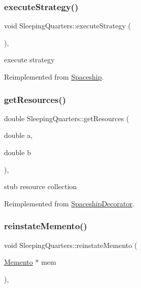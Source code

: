 \subsubsection{\texorpdfstring{execute\+Strategy()}{executeStrategy()}}
{\footnotesize\ttfamily void Sleeping\+Quarters\+::execute\+Strategy (\begin{DoxyParamCaption}{ }\end{DoxyParamCaption})\hspace{0.3cm}{\ttfamily [inline]}, {\ttfamily [virtual]}}

execute strategy 

Reimplemented from \hyperlink{classSpaceship}{Spaceship}.

\mbox{\label{classSleepingQuarters_aa1c2a40c05a566955965dee8118dc410}} 
\subsubsection{\texorpdfstring{get\+Resources()}{getResources()}}
{\footnotesize\ttfamily double Sleeping\+Quarters\+::get\+Resources (\begin{DoxyParamCaption}\item[{double}]{a,  }\item[{double}]{b }\end{DoxyParamCaption})\hspace{0.3cm}{\ttfamily [inline]}, {\ttfamily [virtual]}}

stub resource collection 

Reimplemented from \hyperlink{classSpaceshipDecorator_a5ee7a9a8c146c85f08591e47d971dce7}{Spaceship\+Decorator}.

\mbox{\label{classSleepingQuarters_a9a1fd96cb88a4eee245c7dda3672fac5}} 
\subsubsection{\texorpdfstring{reinstate\+Memento()}{reinstateMemento()}}
{\footnotesize\ttfamily void Sleeping\+Quarters\+::reinstate\+Memento (\begin{DoxyParamCaption}\item[{\hyperlink{classMemento}{Memento} $\ast$}]{mem }\end{DoxyParamCaption})\hspace{0.3cm}{\ttfamily [inline]}, {\ttfamily [virtual]}}

